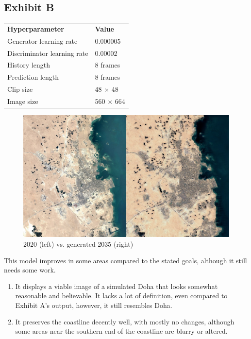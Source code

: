 \documentclass{article}
\begin{document}
\clearpage

\subsection{Exhibit B}

\begin{table}[h]
\begin{tabular}{ll}
\textbf{Hyperparameter} & \textbf{Value}\\
Generator learning rate & 0.000005\\
Discriminator learning rate & 0.00002\\
History length & 8 frames\\
Prediction length & 8 frames\\
Clip size & 48 $\times$ 48\\
Image size & 560 $\times$ 664\\
\end{tabular}
\end{table}

\begin{figure}[H]
    \caption{2020 (left) vs. generated 2035 (right)}
    \centering
    \includegraphics[width=0.7\linewidth]{exhibit-b-comp.jpg}
\end{figure}

This model improves in some areas compared to the stated goals, although it still needs some work.

\begin{enumerate}[label=(\alph*)]
    \item It displays a viable image of a simulated Doha that looks somewhat reasonable and believable. It lacks a lot of definition, even compared to Exhibit A's output, however, it still resembles Doha.
    \item It preserves the coastline decently well, with mostly no changes, although some areas near the southern end of the coastline are blurry or altered.
\end{enumerate}
\end{document}
